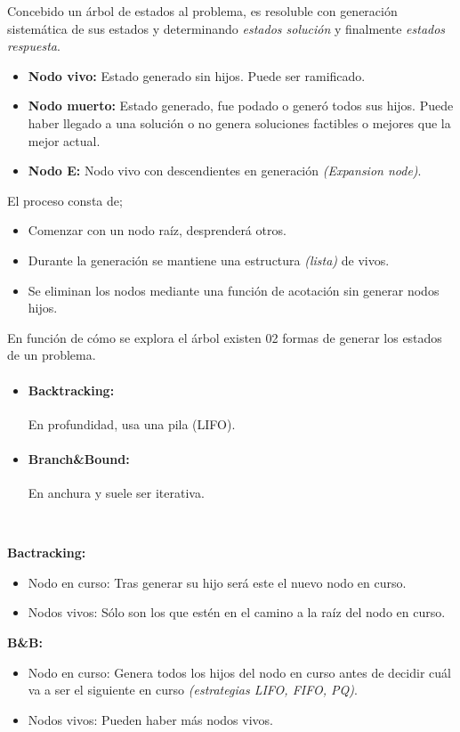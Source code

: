 \documentclass[tikz,11pt,fleqn]{book} %
\begin{document}
\begin{theorem}
	Concebido un árbol de estados al problema, es resoluble con generación sistemática de sus estados y determinando \textit{estados solución} y finalmente \textit{estados respuesta}.
	\begin{itemize}
		\item \textbf{Nodo vivo:} Estado generado sin hijos. Puede ser ramificado.
		\item \textbf{Nodo muerto:} Estado generado, fue podado o generó todos sus hijos. Puede haber llegado a una solución o no genera soluciones factibles o mejores que la mejor actual.
		\item \textbf{Nodo E:} Nodo vivo con descendientes en generación \textit{(Expansion node)}.
	\end{itemize}
	El proceso consta de;
	\begin{itemize}
		\item Comenzar con un nodo raíz, desprenderá otros.
		\item Durante la generación se mantiene una estructura \textit{(lista)} de vivos.
		\item Se eliminan los nodos mediante una función de acotación sin generar nodos hijos.
	\end{itemize}
\end{theorem}

En función de cómo se explora el árbol existen 02 formas de generar los estados de un problema.

\begin{itemize}
	\item \paragraph{Backtracking:} En profundidad, usa una pila (LIFO).
	\item \paragraph{Branch\&Bound:} En anchura y suele ser iterativa.
\end{itemize}

\begin{theorem}[Diferencias]~

	\textbf{Bactracking:}
	\begin{itemize}
		\item Nodo en curso: Tras generar su hijo será este el nuevo nodo en curso.
		\item Nodos vivos: Sólo son los que estén en el camino a la raíz del nodo en curso.
	\end{itemize}

	\textbf{B\&B:}
	\begin{itemize}
		\item Nodo en curso: Genera todos los hijos del nodo en curso antes de decidir cuál va a ser el siguiente en curso \textit{(estrategias LIFO, FIFO, PQ)}.
		\item Nodos vivos: Pueden haber más nodos vivos.
	\end{itemize}
\end{theorem}
\end{document}
